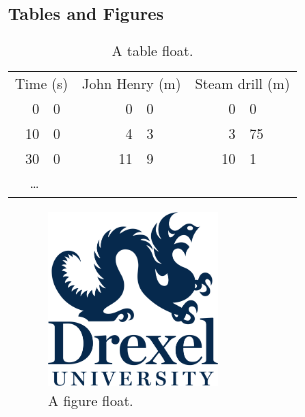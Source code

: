 \subsubsection{Tables and Figures}
\begin{table}
  \begin{center}
  \begin{tabular}{r@{.}l r@{.}l r@{.}l}
    \multicolumn{2}{c}{Time (s)} &
      \multicolumn{2}{c}{John Henry (m)} &
      \multicolumn{2}{c}{Steam drill (m)} \\
    0&0 & 0&0 & 0&0 \\
    10&0 & 4&3 & 3&75 \\
    30&0 & 11&9 & 10&1 \\
    \ldots
  \end{tabular}
  \caption{A table float.} %
  \end{center}
\end{table}
\Blindtext[2]
\begin{figure}
  \caption{A figure float. \blindtext} %
  \begin{center}
    \includegraphics[width=0.4\textwidth]{drexel-logo}
  \end{center}
\end{figure}

